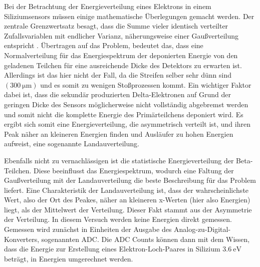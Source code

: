 Bei der Betrachtung der Energieverteilung eines Elektrons in einem
Siliziumsensors müssen einige mathematische Überlegungen gemacht werden. Der
zentrale Grenzwertsatz besagt, dass die Summe vieler identisch verteilter
Zufallsvariablen mit endlicher Varianz, näherungsweise einer Gaußverteilung
entspricht \cite{Grenzwert}. Übertragen auf das Problem, bedeutet das, dass eine
Normalverteilung für das Energiespektrum der deponierten Energie von den
geladenen Teilchen für eine ausreichende Dicke des Detektors zu erwarten ist.
Allerdings ist das hier nicht der Fall, da die Streifen selber sehr dünn sind
$\left(\SI{300}{\micro\meter}  \right)$ und es somit zu wenigen Stoßprozessen
kommt. Ein wichtiger Faktor dabei ist, dass die sekundär produzierten
Delta-Elektronen auf Grund der geringen Dicke des Sensors möglicherweise nicht
vollständig abgebremst werden und somit nicht die komplette Energie des Primärteilchens
deponiert wird. Es ergibt sich somit eine Energieverteilung, die asymmetrisch
verteilt ist, und ihren Peak näher an kleineren Energien finden und Ausläufer
zu hohen Energien aufweist, eine sogenannte Landauverteilung. \par \smallskip

Ebenfalls nicht zu vernachlässigen ist die statistische Energieverteilung der
Beta-Teilchen. Diese beeinflusst das Energiespektrum, wodurch eine Faltung
der Gaußverteilung mit der Landauverteilung die beste Beschreibung für das
Problem liefert.
Eine Charakteristik der Landauverteilung ist, dass der wahrscheinlichste Wert,
also der Ort des Peakes, näher an kleineren x-Werten (hier also Energien) liegt,
als der Mittelwert der Verteilung. Dieser Fakt stammt aus der Asymmetrie
der Verteilung. In diesem Versuch werden keine Energien direkt gemessen. Gemessen
wird zunächst in Einheiten der Ausgabe des Analog-zu-Digital-Konverters, sogenannten ADC.
Die ADC Counts können dann mit dem Wissen, dass die Energie zur Erstellung eines
Elektron-Loch-Paares in Silizium $\SI{3.6}{\electronvolt}$ beträgt, in
Energien umgerechnet werden.
\newpage
